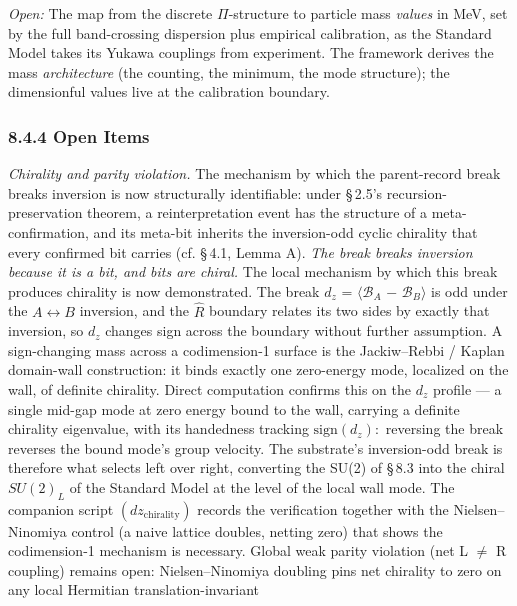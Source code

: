 \documentclass[11pt,oneside]{report}
\theoremstyle{definition}
\theoremstyle{remark}
\begin{document}
\emph{Open:} The map from the discrete \ensuremath{\Pi}-structure to particle mass
\emph{values} in MeV, set by the full band-crossing dispersion plus
empirical calibration, as the Standard Model takes its Yukawa couplings
from experiment. The framework derives the mass \emph{architecture} (the
counting, the minimum, the mode structure); the dimensionful values live
at the calibration boundary.

\subsubsection*{8.4.4 Open Items}

\emph{Chirality and parity violation.} The mechanism by which the
parent-record break breaks inversion is now structurally identifiable:
under \S\,2.5's recursion-preservation theorem, a reinterpretation event
has the structure of a meta-confirmation, and its meta-bit inherits the
inversion-odd cyclic chirality that every confirmed bit carries (cf.
\S\,4.1, Lemma A). \emph{The break breaks inversion because it is a bit,
and bits are chiral.} The local mechanism by which this break produces
chirality is now demonstrated. The break \ensuremath{d_{z}} = \ensuremath{\langle \mathcal{B}_{A}} \ensuremath{-} \ensuremath{\mathcal{B}_{B}\rangle} is odd
under the \ensuremath{A\leftrightarrow B} inversion, and the \ensuremath{\hat{R}} boundary relates its two sides by
exactly that inversion, so \ensuremath{d_{z}} changes sign across the boundary without
further assumption. A sign-changing mass across a codimension-1 surface
is the Jackiw--Rebbi / Kaplan domain-wall construction: it binds exactly
one zero-energy mode, localized on the wall, of definite chirality.
Direct computation confirms this on the \ensuremath{d_{z}} profile --- a single
mid-gap mode at zero energy bound to the wall, carrying a definite
chirality eigenvalue, with its handedness tracking \ensuremath{\text{sign}(d_{z}):} reversing
the break reverses the bound mode's group velocity. The substrate's
inversion-odd break is therefore what selects left over right,
converting the SU(2) of \S\,8.3 into the chiral \ensuremath{SU(2)_{L}} of the Standard
Model at the level of the local wall mode. The companion script
\ensuremath{(dz_{\mathrm{chirality}})} records the verification together with the
Nielsen--Ninomiya control (a naive lattice doubles, netting zero) that
shows the codimension-1 mechanism is necessary. Global weak parity
violation (net L \ensuremath{\neq} R coupling) remains open: Nielsen--Ninomiya doubling
pins net chirality to zero on any local Hermitian translation-invariant
\end{document}
